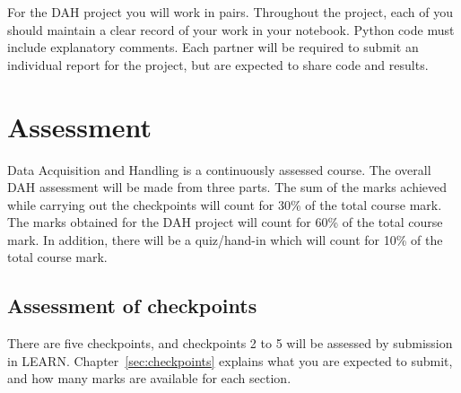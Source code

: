 For the DAH project you will work in pairs.
Throughout the project, each of you should maintain a clear record of your work in your notebook.
Python code must include explanatory comments.
Each partner will be required to submit an individual report for the project, but are expected to share code and results.

\newpage
\section{Assessment} 

Data Acquisition and Handling is a continuously assessed course.
The overall DAH  assessment will be made from three parts.
The sum of the marks achieved while carrying out the checkpoints will count for 30\% of the total course mark.
The marks obtained for the DAH project will count for 60\% of the total course mark.
In addition, there will be a quiz/hand-in which will count for 10\% of the total course mark.

\subsection{Assessment of checkpoints}

There are five checkpoints, and checkpoints 2 to 5 will be assessed by submission in LEARN.
Chapter~\ref{sec:checkpoints} explains what you are expected to submit, and how many marks are available for each section.

